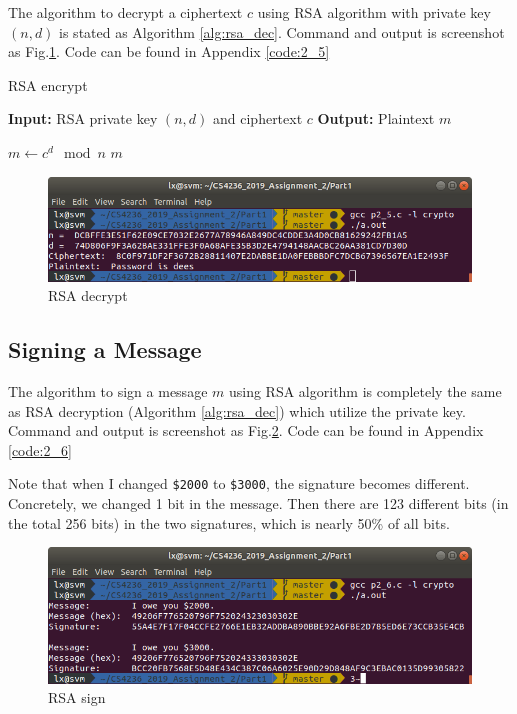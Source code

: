 The algorithm to decrypt a ciphertext $c$ using RSA algorithm with private key $(n, d) $ is stated as Algorithm \ref{alg:rsa_dec}.
Command and output is screenshot as Fig.\ref{fig:p2_5}.
Code can be found in Appendix \ref{code:2_5}

\begin{algorithm}
\caption{RSA encrypt}
\label{alg:rsa_dec}
\begin{algorithmic}
\STATE \textbf{Input:} RSA private key $(n, d)$ and ciphertext $c$
\STATE \textbf{Output:} Plaintext $m$

\STATE $ m \gets c^d \mod{n} $
\RETURN $ m $
\end{algorithmic}
\end{algorithm}

\begin{figure}[ht]
\centering
\includegraphics[width=\columnwidth]{pictures/p2_5.png}
\caption{
    RSA decrypt
}
\label{fig:p2_5}
\end{figure}

\subsection{Signing a Message}
\label{subs:sign}

The algorithm to sign a message $m$ using RSA algorithm is completely the same as RSA decryption (Algorithm \ref{alg:rsa_dec}) which utilize the private key.
Command and output is screenshot as Fig.\ref{fig:p2_6}.
Code can be found in Appendix \ref{code:2_6}

Note that when I changed \texttt{\$2000} to \texttt{\$3000}, the signature becomes different. Concretely, we changed 1 bit in the message. Then there are 123 different bits (in the total 256 bits) in the two signatures, which is nearly 50\% of all bits.

\begin{figure}[ht]
\centering
\includegraphics[width=\columnwidth]{pictures/p2_6.png}
\caption{
    RSA sign
}
\label{fig:p2_6}
\end{figure}

